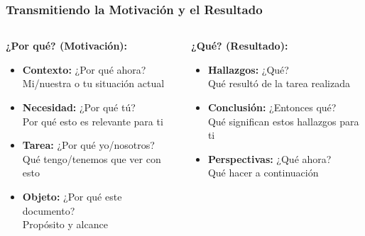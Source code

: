 \documentclass{beamer}
\begin{document}
\begin{frame}
\frametitle{Transmitiendo la Motivación y el Resultado}

\begin{columns}[T]
\begin{column}{0.48\textwidth}
\textbf{¿Por qué? (Motivación):}
\begin{itemize}
    \item \textbf{Contexto:} ¿Por qué ahora?\\
    Mi/nuestra o tu situación actual
    
    \item \textbf{Necesidad:} ¿Por qué tú?\\
    Por qué esto es relevante para ti
    
    \item \textbf{Tarea:} ¿Por qué yo/nosotros?\\
    Qué tengo/tenemos que ver con esto
    
    \item \textbf{Objeto:} ¿Por qué este documento?\\
    Propósito y alcance
\end{itemize}
\end{column}

\begin{column}{0.48\textwidth}
\textbf{¿Qué? (Resultado):}
\begin{itemize}
    \item \textbf{Hallazgos:} ¿Qué?\\
    Qué resultó de la tarea realizada
    
    \item \textbf{Conclusión:} ¿Entonces qué?\\
    Qué significan estos hallazgos para ti
    
    \item \textbf{Perspectivas:} ¿Qué ahora?\\
    Qué hacer a continuación
\end{itemize}
\end{column}
\end{columns}

\vspace{0.3cm}

\end{frame}
\end{document}
